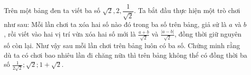 \begin{ex}%
   Trên một bảng đen ta viết ba số $\sqrt{2}, 2, \dfrac{1}{\sqrt{2}}$. Ta bắt đầu thực hiện một trò chơi như sau: Mỗi lần chơi ta xóa hai số nào đó trong ba số trên bảng, giả sử là $a$ và $b$, rồi viết vào hai vị trí vừa xóa hai số mới là $\displaystyle \frac{a+b}{\sqrt{2}}$ và $\displaystyle\frac{|a-b|}{\sqrt{2}}$, đồng thời giữ nguyên số còn lại. Như vậy sau mỗi lần chơi trên bảng luôn có ba số. Chứng minh rằng dù ta có chơi bao nhiêu lần đi chăng nữa thì trên bảng không thể có đồng thời ba số $\displaystyle\frac{1}{2\sqrt{2}};\sqrt{2};1+\sqrt{2}$.
\end{ex}

